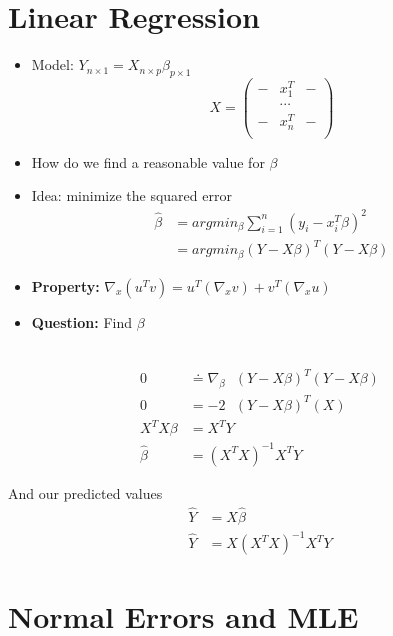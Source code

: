 \documentclass[12pt]{article}
\begin{document}
\section{Linear Regression}
\begin{itemize}
	\item Model: $Y_{n \times 1} = X_{n \times p} \beta_{p \times 1}$
	\begin{equation*}
	X = \left( 
	\begin{array}{ccccc}
	- & x_1^T & - \\
	  & \cdots &   \\
	- & x_n^T & - \\
	\end{array} 
	\right)
	\end{equation*}
	
	\item How do we find a reasonable value for $\beta$
	\item Idea: minimize the squared error
	\begin{align*}
	\hat{\beta} &= argmin_\beta \sum_{i = 1}^{n} (y_i - x_i^T \beta)^2 \\
	&= argmin_\beta (Y-X \beta)^T(Y-X \beta)
	\end{align*}
	\item \textbf{Property:} $\nabla_x (u^Tv) = u^T (\nabla_x v) + v^T (\nabla_x u)$
	\item \textbf{Question:} Find $\beta$ \\ \\
\end{itemize}

\begin{align*}
	0 &\doteq \nabla_\beta \text{ } (Y-X \beta)^T(Y-X \beta) \\
	0 &= -2 \text{ }(Y-X \beta)^T(X) \\
	X^T X \beta &= X^T Y \\
	\hat{\beta} &= (X^T X)^{-1} X^T Y
\end{align*}

And our predicted values
\begin{align*}
	\hat{Y} &= X \hat{\beta} \\
	\hat{Y} &= X (X^T X)^{-1} X^T Y
\end{align*}

\newpage

\section{Normal Errors and MLE}
\end{document}
